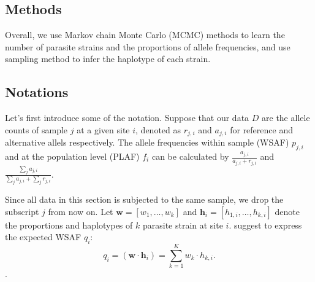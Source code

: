 \documentclass{bioinfo}
\begin{document}
\begin{methods}

\section{Methods}
Overall, we use Markov chain Monte Carlo (MCMC) methods to learn the number of parasite strains and the proportions of allele frequencies, and use sampling method to infer the haplotype of each strain.




\subsection{Notations}
Let's first introduce some of the notation. Suppose that our data $D$ are the allele counts of sample $j$ at a given site $i$, denoted as $r_{j,i}$ and $a_{j,i}$ for reference and alternative allels respectively. The allele frequencies within sample (WSAF) $p_{j,i}$ and at the population level (PLAF) $f_i$ can be calculated by $ \frac{a_{j,i}}{a_{j,i} + r_{j,i}}$ and $ \frac{\sum_j a_{j,i}}{\sum_j a_{j,i} + \sum_j r_{j,i}}$.

Since all data in this section is subjected to the same sample, we drop the subscript $j$ from now on. Let $\mathbf w = [w_1,\dots, w_k]$ and $\mathbf{h}_{i} = [h_{1,i},\dots,h_{k,i}]$ denote the proportions and haplotypes of $k$ parasite strain at site $i$. \citet{Jack2016} suggest to express the expected WSAF $q_{i}$:
\begin{equation}
q_i= (\mathbf{w}\cdot\mathbf{h}_{i})  =  \sum_{k=1}^{K} w_k \cdot h_{k,i} .\label{eqn:qij_full_sum}
\end{equation}.


\end{methods}
\end{document}
